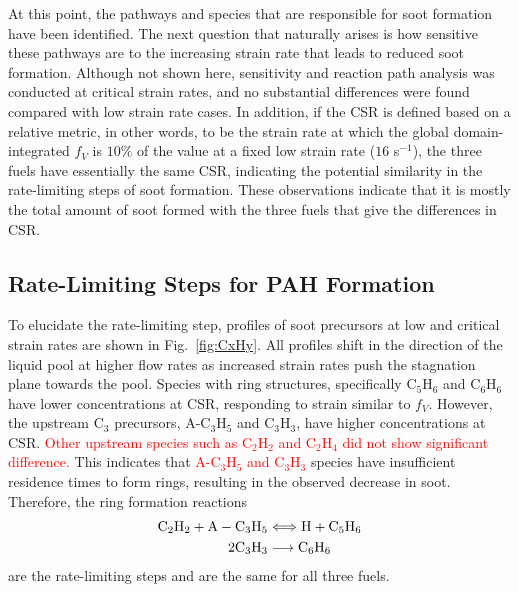 \documentclass[review,3p,times]{elsarticleUS}
\begin{document}
At this point, the pathways and species that are responsible for soot formation have been identified. The next question that naturally arises is how sensitive these pathways are to the increasing strain rate that leads to reduced soot formation. Although not shown here, sensitivity and reaction path analysis was conducted at critical strain rates, and no substantial differences were found compared with low strain rate cases. In addition, if the CSR is defined based on a relative metric, in other words, to be the strain rate at which the global domain-integrated $f_V$ is $10\%$ of the value at a fixed low strain rate ($16$ s$^{-1}$), the three fuels have essentially the same CSR, indicating the potential similarity in the rate-limiting steps of soot formation. These observations indicate that it is mostly the total amount of soot formed with the three fuels that give the differences in CSR.


\subsection{Rate-Limiting Steps for PAH Formation}

To elucidate the rate-limiting step, profiles of soot precursors at low and critical strain rates are shown in Fig.~\ref{fig:CxHy}. All profiles shift in the direction of the liquid pool at higher flow rates as increased strain rates push the stagnation plane towards the pool. Species with ring structures, specifically C$_5$H$_6$ and C$_6$H$_6$ have lower concentrations at CSR, responding to strain similar to $f_V$. However, the upstream C$_3$ precursors, A-C$_3$H$_5$ and C$_3$H$_3$, have higher concentrations at CSR. \textcolor{red}{Other upstream species such as C$_2$H$_2$ and C$_2$H$_4$ did not show significant difference.}  This indicates that \textcolor{red}{A-C$_3$H$_5$ and C$_3$H$_3$} species have insufficient residence times to form rings, resulting in the observed decrease in soot. Therefore, the ring formation reactions
\begin{align*}
  {\rm C}_2{\rm H}_2 + {\rm A}-{\rm C}_3{\rm H}_5 &\Longleftrightarrow {\rm H} + {\rm C}_5{\rm H}_6\\
  2 {\rm C}_3{\rm H}_3 &\longrightarrow {\rm C}_6{\rm H}_6
\end{align*}
are the rate-limiting steps and are the same for all three fuels.
\end{document}

